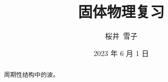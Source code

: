 \documentclass{article}
\title{固体物理复习}
\author{桜井\ 雪子}
\date{2023 年 6 月 1 日}
\begin{document}
\maketitle

\begin{abstract}
    周期性结构中的波。
\end{abstract}






\end{document}
